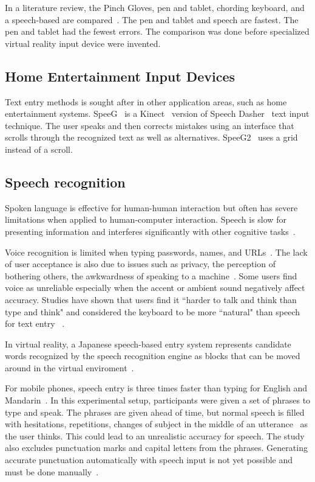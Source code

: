In a literature review, the Pinch Gloves, pen and tablet, chording keyboard, and a speech-based are compared~\cite{bowman2002text}.
The pen and tablet and speech are fastest.  The pen and tablet had the fewest errors.
The comparison was done before specialized virtual reality input device were invented.

\subsection{Home Entertainment Input Devices}
Text entry methods is sought after in other application areas, such as home entertainment systems.
SpeeG~\cite{hoste2012speeg} is a Kinect~\cite{geerse2015kinematic} version of Speech Dasher~\cite{vertanen2010speech} text input technique.
The user speaks and then corrects mistakes using an interface that scrolls through the recognized text as well as alternatives.
SpeeG2~\cite{hoste2013speeg2} uses a grid instead of a scroll.

\subsection{Speech recognition}
Spoken language is effective for human-human interaction but often has severe limitations when applied to human-computer interaction.
Speech is slow for presenting information and interferes significantly with other cognitive tasks~\cite{shneiderman2000limits}.

Voice recognition is limited when typing passwords, names, and URLs~\cite{TODO}. 
The lack of user acceptance is also due to issues such as privacy, the perception of bothering others, the awkwardness of speaking to a machine~\cite{sawhney2000nomadic}.
Some users find voice as unreliable especially when the accent or ambient sound negatively affect accuracy.
Studies have shown that users find it ``harder to talk and think than type and think" and considered the keyboard to be more ``natural" than speech for text entry ~\cite{Karat:1999:PEC:302979.303160}.

In virtual reality, a Japanese speech-based entry system represents candidate words recognized by the speech recognition engine as blocks that can be moved around in the virtual enviroment~\cite{osawa2002multimodal}. 

For mobile phones, speech entry is three times faster than typing for English and Mandarin~\cite{ruan2016speech}.  
In this experimental setup, participants were given a set of phrases to type and speak.
The phrases are given ahead of time, but normal speech is filled with hesitations, repetitions, changes of subject in the middle of an utterance~\cite{forsberg2003speech} as the user thinks.
This could lead to an unrealistic accuracy for speech.  
The study also excludes punctuation marks and capital letters from the phrases.
Generating accurate punctuation  automatically with speech input is not yet possible and must be done manually~\cite{chen1999speech}.

